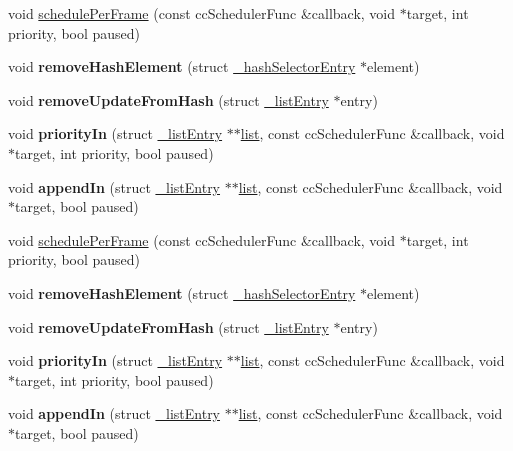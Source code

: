 \begin{DoxyCompactItemize}
\item 
void \hyperlink{classScheduler_a9910c07a3c437d44478004a5c407834a}{schedule\+Per\+Frame} (const cc\+Scheduler\+Func \&callback, void $\ast$target, int priority, bool paused)
\item 
\mbox{\label{classScheduler_a0d620448fd72d27c419ee44e9306534d}} 
void {\bfseries remove\+Hash\+Element} (struct \hyperlink{struct__hashSelectorEntry}{\+\_\+hash\+Selector\+Entry} $\ast$element)
\item 
\mbox{\label{classScheduler_a8737ffcc95536a8627da93228c55520b}} 
void {\bfseries remove\+Update\+From\+Hash} (struct \hyperlink{struct__listEntry}{\+\_\+list\+Entry} $\ast$entry)
\item 
\mbox{\label{classScheduler_ac8a8ac12f4f63a635143e835d975d6f1}} 
void {\bfseries priority\+In} (struct \hyperlink{struct__listEntry}{\+\_\+list\+Entry} $\ast$$\ast$\hyperlink{protocollist-p}{list}, const cc\+Scheduler\+Func \&callback, void $\ast$target, int priority, bool paused)
\item 
\mbox{\label{classScheduler_af5a45f15eee06968c40c59a4614797c2}} 
void {\bfseries append\+In} (struct \hyperlink{struct__listEntry}{\+\_\+list\+Entry} $\ast$$\ast$\hyperlink{protocollist-p}{list}, const cc\+Scheduler\+Func \&callback, void $\ast$target, bool paused)
\item 
void \hyperlink{classScheduler_a9910c07a3c437d44478004a5c407834a}{schedule\+Per\+Frame} (const cc\+Scheduler\+Func \&callback, void $\ast$target, int priority, bool paused)
\item 
\mbox{\label{classScheduler_a0d620448fd72d27c419ee44e9306534d}} 
void {\bfseries remove\+Hash\+Element} (struct \hyperlink{struct__hashSelectorEntry}{\+\_\+hash\+Selector\+Entry} $\ast$element)
\item 
\mbox{\label{classScheduler_a8737ffcc95536a8627da93228c55520b}} 
void {\bfseries remove\+Update\+From\+Hash} (struct \hyperlink{struct__listEntry}{\+\_\+list\+Entry} $\ast$entry)
\item 
\mbox{\label{classScheduler_ac8a8ac12f4f63a635143e835d975d6f1}} 
void {\bfseries priority\+In} (struct \hyperlink{struct__listEntry}{\+\_\+list\+Entry} $\ast$$\ast$\hyperlink{protocollist-p}{list}, const cc\+Scheduler\+Func \&callback, void $\ast$target, int priority, bool paused)
\item 
\mbox{\label{classScheduler_af5a45f15eee06968c40c59a4614797c2}} 
void {\bfseries append\+In} (struct \hyperlink{struct__listEntry}{\+\_\+list\+Entry} $\ast$$\ast$\hyperlink{protocollist-p}{list}, const cc\+Scheduler\+Func \&callback, void $\ast$target, bool paused)
\end{DoxyCompactItemize}
